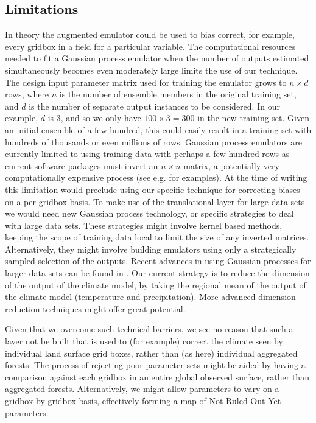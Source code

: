 \documentclass[gmd, manuscript]{copernicus}
\begin{document}
\subsection{Limitations}
In theory the augmented emulator could be used to bias correct, for example, every gridbox in a field for a particular variable. The computational resources needed to fit a Gaussian process emulator when the number of outputs estimated simultaneously becomes even moderately large limits the use of our technique. The design input parameter matrix used for training the emulator grows to $n \times d$ rows, where $n$ is the number of ensemble members in the original training set, and $d$ is the number of separate output instances to be considered. In our example, $d$ is 3, and so we only have $100 \times 3 = 300$ in the new training set. Given an initial ensemble of a few hundred, this could easily result in a training set with hundreds of thousands or even millions of rows. Gaussian process emulators are currently limited to using training data with perhaps a few hundred rows as current software packages must invert an $n \times n$ matrix, a potentially very computationally expensive process (see e.g. \cite{hensman2013gaussian} for examples). At the time of writing this limitation would preclude using our specific technique for correcting biases on a per-gridbox basis. To make use of the translational layer for large data sets we would need new Gaussian process technology, or specific strategies to deal with large data sets. These strategies might involve kernel based methods, keeping the scope of training data local to limit the size of any inverted matrices. Alternatively, they might involve building emulators using only a strategically sampled selection of the outputs. Recent advances in using Gaussian processes for larger data sets can be found in \cite{hensman2013gaussian, hensman2015scalable, wilson2015thoughts,wilson2015kernel}. Our current strategy is to reduce the dimension of the output of the climate model, by taking the regional mean of the output of the climate model (temperature and precipitation). More advanced dimension reduction techniques might offer great potential.

Given that we overcome such technical barriers, we see no reason that such a layer not be built that is used to (for example) correct the climate seen by individual land surface grid boxes, rather than (as here) individual aggregated forests. The process of rejecting poor parameter sets might be aided by having a comparison against each gridbox in an entire global observed surface, rather than aggregated forests. Alternatively, we might allow parameters to vary on a gridbox-by-gridbox basis, effectively forming a map of Not-Ruled-Out-Yet parameters. 
\end{document}
